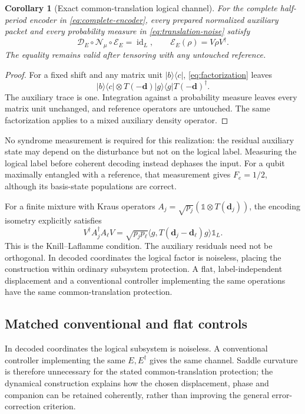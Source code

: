 \documentclass[aip,adv,reprint,onecolumn,amsmath,amssymb]{revtex4-2}
\newcommand{\Id}{\mathbb 1}
\newcommand{\ket}[1]{\lvert #1\rangle}
\newcommand{\bra}[1]{\langle #1\rvert}
\newtheorem{corollary}[theorem]{Corollary}
\begin{document}
\begin{corollary}[Exact common-translation logical channel]
For the complete half-period encoder in \eqref{eq:complete-encoder}, every prepared normalized auxiliary packet and every probability measure in \eqref{eq:translation-noise} satisfy
\begin{equation}
 \mathcal D_E\circ\mathcal N_\mu\circ\mathcal E_E=\operatorname{id}_L,
 \qquad\mathcal E_E(\rho)=V\rho V^\dagger.
 \label{eq:exact-channel}
\end{equation}
The equality remains valid after tensoring with any untouched reference.
\end{corollary}
\begin{proof}
For a fixed shift and any matrix unit $\ket b\bra c$, \eqref{eq:factorization} leaves
\begin{equation}
 \ket b\bra c\otimes T(-\bm d)\ket g\bra gT(-\bm d)^\dagger.
 \label{eq:recovered-matrix-unit}
\end{equation}
The auxiliary trace is one. Integration against a probability measure leaves every matrix unit unchanged, and reference operators are untouched. The same factorization applies to a mixed auxiliary density operator.
\end{proof}
No syndrome measurement is required for this realization: the residual auxiliary state may depend on the disturbance but not on the logical label. Measuring the logical label before coherent decoding instead dephases the input. For a qubit maximally entangled with a reference, that measurement gives $F_e=1/2$, although its basis-state populations are correct.

For a finite mixture with Kraus operators $A_j=\sqrt{p_j}(\Id\otimes T(\bm d_j))$, the encoding isometry explicitly satisfies
\begin{equation}
 V^\dagger A_j^\dagger A_\ell V=\sqrt{p_jp_\ell}\langle g,T(\bm d_j-\bm d_\ell)g\rangle\Id_L.
 \label{eq:KL}
\end{equation}
This is the Knill--Laflamme condition.\cite{knill} The auxiliary residuals need not be orthogonal. In decoded coordinates the logical factor is noiseless, placing the construction within ordinary subsystem protection.\cite{kribs} A flat, label-independent displacement and a conventional controller implementing the same operations have the same common-translation protection.


\subsection{Matched conventional and flat controls}
In decoded coordinates the logical subsystem is noiseless. A conventional controller implementing the same $E,E^\dagger$ gives the same channel. Saddle curvature is therefore unnecessary for the stated common-translation protection; the dynamical construction explains how the chosen displacement, phase and companion can be retained coherently, rather than improving the general error-correction criterion.
\end{document}
